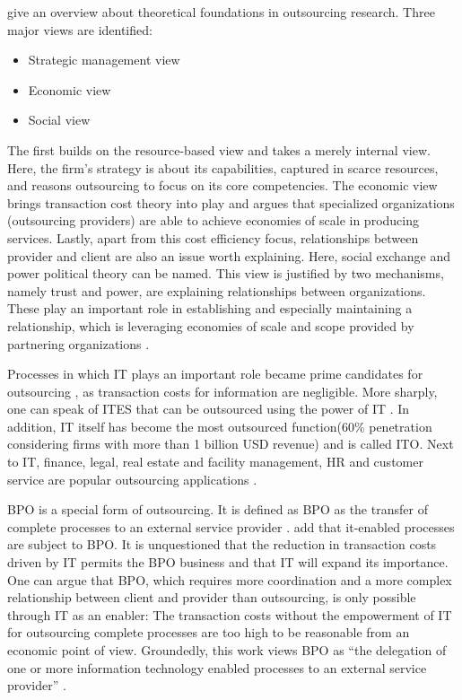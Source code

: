 		\cite{Lee:2000} give an overview about theoretical foundations in outsourcing research. Three major views are identified:
		
		\begin{itemize}
			\item Strategic management view
			\item Economic view
			\item Social view
		\end{itemize}
		
		The first builds on the resource-based view \citep{wernerfelt1984resource} and takes a merely internal view. Here, the firm's strategy is about its capabilities, captured in scarce resources, and reasons outsourcing to focus on its core competencies. The economic view brings transaction cost theory into play and argues that specialized organizations (outsourcing providers) are able to achieve economies of scale in producing services. Lastly, apart from this cost efficiency focus, relationships between provider and client are also an issue worth explaining. Here, social exchange and power political theory \citep{lee1999effect} can be named. This view is justified by two mechanisms, namely trust and power, are explaining relationships between organizations. These play an important role in establishing and especially maintaining a relationship, which is leveraging economies of scale and scope provided by partnering organizations \citep{rai1996critical}. 
		
		
		Processes in which IT plays an important role became prime candidates for outsourcing \citep[]{gross2007}, as transaction costs for information are negligible. More sharply, one can speak of \acrfull{ITES} that can be outsourced using the power of IT \citep[]{Ramachandran2004}. In addition, IT itself has become the most outsourced function(60\% penetration \citep{deloitte2014outsourcing} considering firms with more than 1 billion USD revenue) and is called \acrfull{ITO}. Next to IT, finance, legal, real estate and facility management, HR and customer service are popular outsourcing applications \citep{deloitte2014outsourcing}. 
		
		\acrshort{BPO} is a special form of outsourcing. It is defined as \acrshort{BPO} as the transfer of complete processes to an external service provider \citep{wullenweber2008impact}. \cite{mani2010emp} add that it-enabled processes are subject to BPO. It is unquestioned that the reduction in transaction costs driven by IT permits the BPO business and that IT will expand its importance. One can argue that BPO, which requires more coordination and a more complex relationship between client and provider than outsourcing, is only possible through IT as an enabler: The transaction costs without the empowerment of IT for outsourcing complete processes are too high to be reasonable from an economic point of view. Groundedly, this work views  BPO as \enquote{the delegation of one or more information technology enabled processes to an external service provider} \citep[]{mani2010emp}.
		
